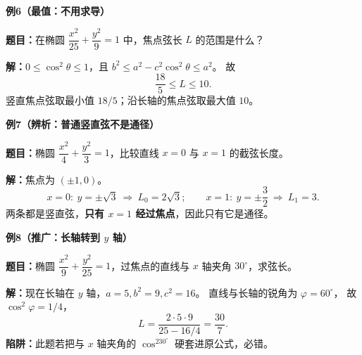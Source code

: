\clearpage
\begin{examplebox}
\textbf{\textcolor{CExample}{例6（最值：不用求导）}}

\textbf{题目：}在椭圆 $\dfrac{x^2}{25}+\dfrac{y^2}{9}=1$ 中，焦点弦长 $L$ 的范围是什么？

\textbf{解：}$0\le\cos^2\theta\le1$，且
$b^2\le a^2-c^2\cos^2\theta\le a^2$。
故
\[
 \boxed{\frac{18}{5}\le L\le10}.
\]
竖直焦点弦取最小值 $18/5$；沿长轴的焦点弦取最大值 $10$。

\medskip
\textbf{\textcolor{CExample}{例7（辨析：普通竖直弦不是通径）}}

\textbf{题目：}椭圆 $\dfrac{x^2}{4}+\dfrac{y^2}{3}=1$，比较直线 $x=0$ 与 $x=1$ 的截弦长度。

\textbf{解：}焦点为 $(\pm1,0)$。
\[
 x=0:\ y=\pm\sqrt3\ \Longrightarrow\ L_0=\boxed{2\sqrt3};\qquad
 x=1:\ y=\pm\frac32\ \Longrightarrow\ L_1=\boxed{3}.
\]
两条都是竖直弦，\textbf{只有 $x=1$ 经过焦点}，因此只有它是通径。

\medskip
\end{examplebox}
\clearpage
\begin{examplebox}
\textbf{\textcolor{CExample}{例8（推广：长轴转到 $y$ 轴）}}

\textbf{题目：}椭圆 $\dfrac{x^2}{9}+\dfrac{y^2}{25}=1$，过焦点的直线与 $x$ 轴夹角 $30^\circ$，求弦长。

\begin{center}\end{center}
\textbf{解：}现在长轴在 $y$ 轴，$a=5,b^2=9,c^2=16$。
直线与长轴的锐角为 $\varphi=60^\circ$，
故 $\cos^2\varphi=1/4$，
\[
 L=\frac{2\cdot5\cdot9}{25-16/4}
 =\boxed{\frac{30}{7}}.
\]
\textbf{陷阱：}此题若把与 $x$ 轴夹角的 $\cos^230^\circ$ 硬套进原公式，必错。

\end{examplebox}
